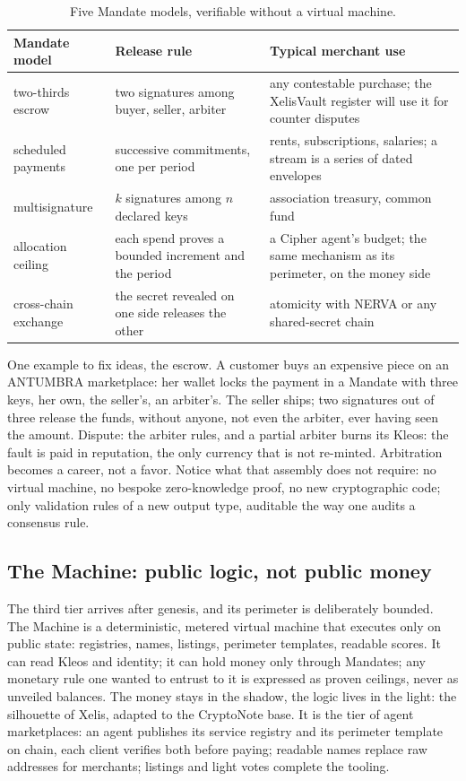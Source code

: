 \begin{table}[htbp]
\centering
\small
\caption{Five Mandate models, verifiable without a virtual machine.}
\label{tab:mandates}
\begin{tabularx}{\textwidth}{@{}L{3.0cm}YY@{}}
\toprule
Mandate model & Release rule & Typical merchant use \\
\midrule
two-thirds escrow & two signatures among buyer, seller, arbiter & any contestable purchase; the XelisVault register will use it for counter disputes \\
scheduled payments & successive commitments, one per period & rents, subscriptions, salaries; a stream is a series of dated envelopes \\
multisignature & $k$ signatures among $n$ declared keys & association treasury, common fund \\
allocation ceiling & each spend proves a bounded increment and the period & a Cipher agent's budget; the same mechanism as its perimeter, on the money side \\
cross-chain exchange & the secret revealed on one side releases the other & atomicity with NERVA or any shared-secret chain \\
\bottomrule
\end{tabularx}
\end{table}

One example to fix ideas, the escrow. A customer buys an expensive piece
on an ANTUMBRA marketplace: her wallet locks the payment in a Mandate
with three keys, her own, the seller's, an arbiter's. The seller ships;
two signatures out of three release the funds, without anyone, not even
the arbiter, ever having seen the amount. Dispute: the arbiter rules,
and a partial arbiter burns its Kleos: the fault is paid in reputation,
the only currency that is not re-minted. Arbitration becomes a career,
not a favor. Notice what that assembly does not require: no virtual
machine, no bespoke zero-knowledge proof, no new cryptographic code;
only validation rules of a new output type, auditable the way one audits
a consensus rule.

\subsection{The Machine: public logic, not public money}

The third tier arrives after genesis, and its perimeter is deliberately
bounded. The Machine is a deterministic, metered virtual machine that
executes only on public state: registries, names, listings, perimeter
templates, readable scores. It can read Kleos and identity; it can hold
money only through Mandates; any monetary rule one wanted to entrust to
it is expressed as proven ceilings, never as unveiled balances. The
money stays in the shadow, the logic lives in the light: the silhouette
of Xelis, adapted to the CryptoNote base. It is the tier of agent
marketplaces: an agent publishes its service registry and its perimeter
template on chain, each client verifies both before paying; readable
names replace raw addresses for merchants; listings and light votes
complete the tooling.

